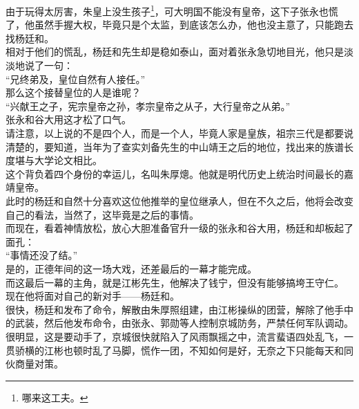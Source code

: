 \begin{multicols}{\theparacolNo}
由于玩得太厉害，朱皇上没生孩子\footnote{哪来这工夫。}，可大明国不能没有皇帝，这下子张永也慌了，他虽然手握大权，毕竟只是个太监，到底该怎么办，他也没主意了，只能跑去找杨廷和。\\

相对于他们的慌乱，杨廷和先生却是稳如泰山，面对着张永急切地目光，他只是淡淡地说了一句：\\

“兄终弟及，皇位自然有人接任。”\\

那么这个接替皇位的人是谁呢？\\

“兴献王之子，宪宗皇帝之孙，孝宗皇帝之从子，大行皇帝之从弟。”\\

张永和谷大用这才松了口气。\\

请注意，以上说的不是四个人，而是一个人，毕竟人家是皇族，祖宗三代是都要说清楚的，要知道，当年为了查实刘备先生的中山靖王之后的地位，找出来的族谱长度堪与大学论文相比。\\

这个背负着四个身份的幸运儿，名叫朱厚熜。他就是明代历史上统治时间最长的嘉靖皇帝。\\

此时的杨廷和自然十分喜欢这位他推举的皇位继承人，但在不久之后，他将会改变自己的看法，当然了，这毕竟是之后的事情。\\

而现在，看着神情放松，放心大胆准备官升一级的张永和谷大用，杨廷和却板起了面孔：\\

“事情还没了结。”\\

是的，正德年间的这一场大戏，还差最后的一幕才能完成。\\

而这最后一幕的主角，就是江彬先生，他解决了钱宁，但没有能够搞垮王守仁。\\

现在他将面对自己的新对手——杨廷和。\\

很快，杨廷和发布了命令，解散由朱厚照组建，由江彬操纵的团营，解除了他手中的武装，然后他发布命令，由张永、郭勋等人控制京城防务，严禁任何军队调动。\\

很明显，这是要动手了，京城很快就陷入了风雨飘摇之中，流言蜚语四处乱飞，一贯骄横的江彬也顿时乱了马脚，慌作一团，不知如何是好，无奈之下只能每天和同伙商量对策。\\


\end{multicols}
